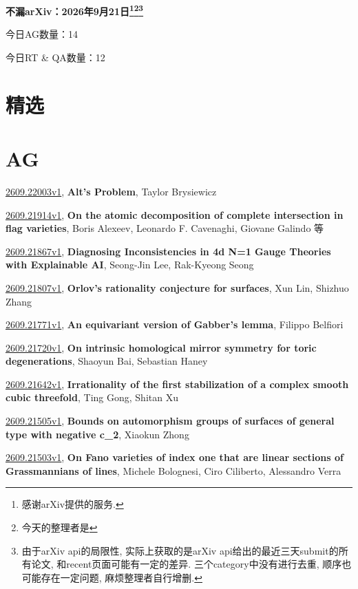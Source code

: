 \documentclass[9pt, a4paper]{article}
\theoremstyle{plain}
\theoremstyle{definition}
\theoremstyle{remark}
\newcommand{\arxiv}[3]{\href{https://arxiv.org/abs/#1}{#1}, \textbf{\textcolor{arxivblue}{#2}}, #3}
\newcommand{\AGnumber}{14}
\newcommand{\RTQAnumber}{12}
\newcommand{\NewestDate}{2026年9月21日}
\newcommand{\todayarXiver}{} %
\begin{document}
\begin{center}
    \Huge\textbf{不漏arXiv：\NewestDate\footnote{感谢arXiv提供的服务.}\footnote{今天的整理者是\todayarXiver}\footnote{由于arXiv api的局限性, 实际上获取的是arXiv api给出的最近三天submit的所有论文, 和recent页面可能有一定的差异. 三个category中没有进行去重, 顺序也可能存在一定问题, 麻烦整理者自行增删.}} \\
\end{center}

\setcounter{section}{-1}

\begin{center}
    今日AG数量：\AGnumber
    
    今日RT \& QA数量：\RTQAnumber
    
\end{center}


\section{精选}


\section{AG}
\arxiv{2609.22003v1}{Alt's Problem}{Taylor Brysiewicz}

\arxiv{2609.21914v1}{On the atomic decomposition of complete intersection in flag varieties}{Boris Alexeev, Leonardo F. Cavenaghi, Giovane Galindo 等}

\arxiv{2609.21867v1}{Diagnosing Inconsistencies in 4d N=1 Gauge Theories with Explainable AI}{Seong-Jin Lee, Rak-Kyeong Seong}

\arxiv{2609.21807v1}{Orlov's rationality conjecture for surfaces}{Xun Lin, Shizhuo Zhang}

\arxiv{2609.21771v1}{An equivariant version of Gabber's lemma}{Filippo Belfiori}

\arxiv{2609.21720v1}{On intrinsic homological mirror symmetry for toric degenerations}{Shaoyun Bai, Sebastian Haney}

\arxiv{2609.21642v1}{Irrationality of the first stabilization of a complex smooth cubic threefold}{Ting Gong, Shitan Xu}

\arxiv{2609.21505v1}{Bounds on automorphism groups of surfaces of general type with negative c_2}{Xiaokun Zhong}

\arxiv{2609.21503v1}{On Fano varieties of index one that are linear sections of Grassmannians of lines}{Michele Bolognesi, Ciro Ciliberto, Alessandro Verra}
\end{document}

